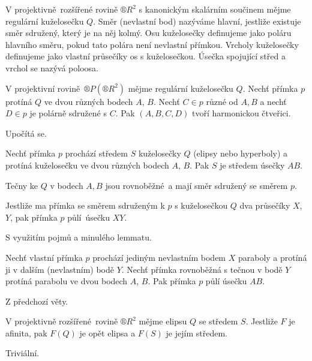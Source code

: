 \documentclass[12pt]{article}					%
\begin{document}
\begin{definice}
	V projektivně rozšířené rovině $®R^2$ s kanonickým skalárním součinem mějme regulární kuželosečku $Q$. Směr (nevlastní bod) nazýváme hlavní, jestliže existuje směr sdružený, který je na něj kolmý. Osu kuželosečky definujeme jako poláru hlavního směru, pokud tato polára není nevlastní přímkou. Vrcholy kuželosečky definujeme jako vlastní průsečíky os s kuželosečkou. Úsečka spojující střed a vrchol se nazývá poloosa.
\end{definice}

\begin{lemma}
	V projektivní rovině $®P(®R^2)$ mějme regulární kuželosečku $Q$. Nechť přímka $p$ protíná $Q$ ve dvou různých bodech $A$, $B$. Nechť $C \in p$ různé od $A, B$ a nechť $D \in p$ je polárně sdružené s $C$. Pak $(A, B, C, D)$ tvoří harmonickou čtveřici.

	\begin{dukazin}
		Upočítá se.
	\end{dukazin}
\end{lemma}

\begin{veta}
	Nechť přímka $p$ prochází středem $S$ kuželosečky $Q$ (elipsy nebo hyperboly) a protíná kuželosečku ve dvou různých bodech $A$, $B$. Pak $S$ je středem úsečky $AB$.

	Tečny ke $Q$ v bodech $A, B$ jsou rovnoběžné a mají směr sdružený se směrem $p$.

	Jestliže ma přímka se směrem sdruženým k $p$ s kuželosečkou $Q$ dva průsečíky $X$, $Y$, pak přímka $p$ půlí úsečku $XY$.

	\begin{dukazin}
		S využitím pojmů a minulého lemmatu.
	\end{dukazin}
\end{veta}

\begin{veta}
	Nechť vlastní přímka $p$ prochází jediným nevlastním bodem $X$ paraboly a protíná ji v dalším (nevlastním) bodě $Y$. Nechť přímka rovnoběžná s tečnou v bodě $Y$ protíná parabolu ve dvou bodech $A$, $B$. Pak přímka $p$ půlí úsečku $AB$.

	\begin{dukazin}
		Z předchozí věty.
	\end{dukazin}
\end{veta}

\begin{veta}
	V projektivně rozšířené rovině $®R^2$ mějme elipsu $Q$ se středem $S$. Jestliže $F$ je afinita, pak $F(Q)$ je opět elipsa a $F(S)$ je jejím středem.

	\begin{dukazin}
		Triviální.
	\end{dukazin}
\end{veta}
\end{document}
